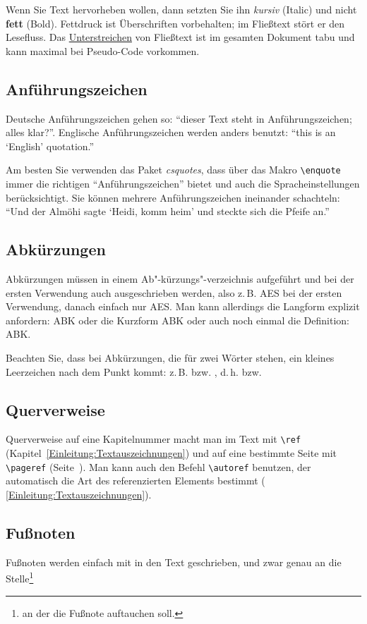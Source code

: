\documentclass[conference,compsoc,final,a4paper]{IEEEtran}
\begin{document}
    Wenn Sie Text hervorheben wollen, dann setzten Sie ihn \textit{kursiv} (Italic) und nicht \textbf{fett} (Bold). Fettdruck ist Überschriften vorbehalten; im Fließtext stört er den Lesefluss. Das \underline{Unterstreichen} von Fließtext ist im gesamten Dokument tabu und kann maximal bei Pseudo-Code vorkommen.

    \subsection{Anführungszeichen}
    Deutsche Anführungszeichen gehen so: "`dieser Text steht in \glq Anführungszeichen\grq; alles klar?"'. Englische Anführungszeichen werden anders benutzt: ``this is an `English' quotation.''

    Am besten Sie verwenden das Paket \textit{csquotes}, dass über das Makro \verb+\enquote+ immer die richtigen \enquote{Anführungszeichen} bietet und auch die Spracheinstellungen berücksichtigt. Sie können mehrere Anführungszeichen ineinander schachteln: \enquote{Und der Almöhi sagte \enquote{Heidi, komm heim} und steckte sich die Pfeife an.}

    \subsection{Abkürzungen}
    Abkürzungen müssen in einem Ab"-kürzungs"-verzeichnis aufgeführt und bei der ersten Verwendung auch ausgeschrieben werden, also z.\,B. \ac{AES} bei der ersten Verwendung, danach einfach nur \ac{AES}. Man kann allerdings die Langform explizit anfordern: \acl{ABK} oder die Kurzform \acs{ABK} oder auch noch einmal die Definition: \acf{ABK}.

    Beachten Sie, dass bei Abkürzungen, die für zwei Wörter stehen, ein kleines Leerzeichen nach dem Punkt kommt: z.\,B. bzw. \zb{}, d.\,h. bzw. \dahe{}

    \subsection{Querverweise}
    Querverweise auf eine Kapitelnummer macht man im Text mit \verb+\ref+ (Kapitel~\ref{Einleitung:Textauszeichnungen}) und auf eine bestimmte Seite mit \verb+\pageref+ (Seite~\pageref{Einleitung:Textauszeichnungen}). Man kann auch den Befehl \verb+\autoref+ benutzen, der automatisch die Art des referenzierten Elements bestimmt (\zb{} \autoref{Einleitung:Textauszeichnungen}).

    \subsection{Fußnoten}
    Fußnoten werden einfach mit in den Text geschrieben, und zwar genau an die Stelle\footnote{an der die Fußnote auftauchen soll.}
\end{document}

